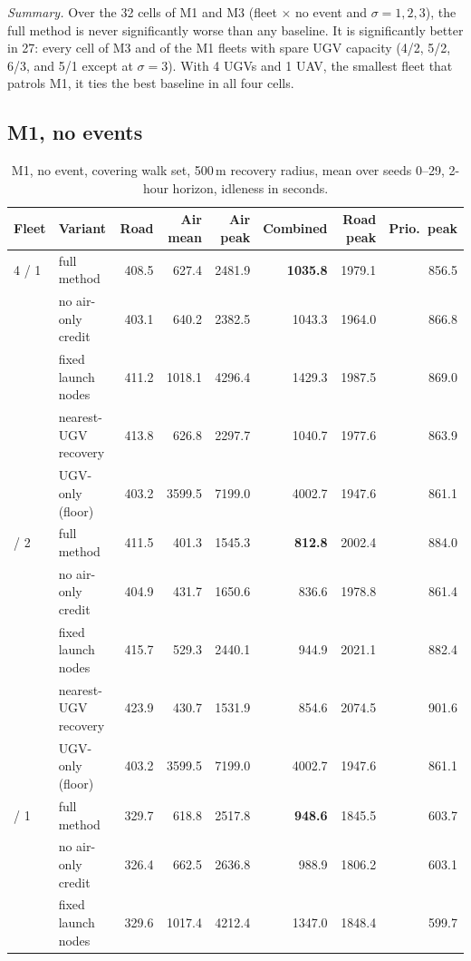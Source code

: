 \documentclass[11pt]{article}
\theoremstyle{definition}
\theoremstyle{plain}
\begin{document}
\emph{Summary.} Over the 32 cells of M1 and M3 (fleet $\times$ no event
and $\sigma = 1, 2, 3$), the full method is never significantly worse than
any baseline. It is significantly better in 27: every cell of M3 and of
the M1 fleets with spare UGV capacity (4/2, 5/2, 6/3, and 5/1 except at
$\sigma = 3$). With 4 UGVs and 1 UAV, the smallest fleet that patrols M1,
it ties the best baseline in all four cells.

\subsection{M1, no events}

\begin{table}[H]
\centering
\small
\caption{M1, no event, covering walk set, 500\,m recovery radius, mean over seeds 0--29, 2-hour horizon, idleness in seconds.}
\label{tab:m1}
\begin{tabular}{llrrrrrr}
\toprule
Fleet & Variant & Road & Air mean & Air peak & Combined & Road peak & Prio.\ peak \\
\midrule
4 / 1 & full method & 408.5 & 627.4 & 2481.9 & \textbf{1035.8} & 1979.1 & 856.5 \\
 & no air-only credit & 403.1 & 640.2 & 2382.5 & 1043.3 & 1964.0 & 866.8 \\
 & fixed launch nodes & 411.2 & 1018.1 & 4296.4 & 1429.3 & 1987.5 & 869.0 \\
 & nearest-UGV recovery & 413.8 & 626.8 & 2297.7 & 1040.7 & 1977.6 & 863.9 \\
 & UGV-only (floor) & 403.2 & 3599.5 & 7199.0 & 4002.7 & 1947.6 & 861.1 \\
\addlinespace
4 / 2 & full method & 411.5 & 401.3 & 1545.3 & \textbf{812.8} & 2002.4 & 884.0 \\
 & no air-only credit & 404.9 & 431.7 & 1650.6 & 836.6 & 1978.8 & 861.4 \\
 & fixed launch nodes & 415.7 & 529.3 & 2440.1 & 944.9 & 2021.1 & 882.4 \\
 & nearest-UGV recovery & 423.9 & 430.7 & 1531.9 & 854.6 & 2074.5 & 901.6 \\
 & UGV-only (floor) & 403.2 & 3599.5 & 7199.0 & 4002.7 & 1947.6 & 861.1 \\
\addlinespace
5 / 1 & full method & 329.7 & 618.8 & 2517.8 & \textbf{948.6} & 1845.5 & 603.7 \\
 & no air-only credit & 326.4 & 662.5 & 2636.8 & 988.9 & 1806.2 & 603.1 \\
 & fixed launch nodes & 329.6 & 1017.4 & 4212.4 & 1347.0 & 1848.4 & 599.7 \\

\end{tabular}
\end{table}
\end{document}

